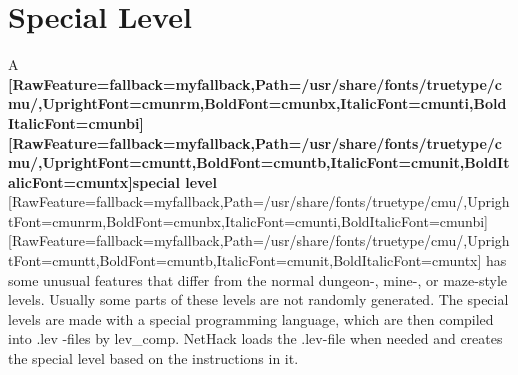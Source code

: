 \part{Special Level}
\label{0}A {\bfseries \allowbreak{}\setmainfont{cmunbx.ttf}[RawFeature={fallback=myfallback},Path=/usr/share/fonts/truetype/cmu/,UprightFont=cmunrm,BoldFont=cmunbx,ItalicFont=cmunti,BoldItalicFont=cmunbi]\setmonofont{cmunbx.ttf}[RawFeature={fallback=myfallback},Path=/usr/share/fonts/truetype/cmu/,UprightFont=cmuntt,BoldFont=cmuntb,ItalicFont=cmunit,BoldItalicFont=cmuntx]\bfseries special level}{$\text{ }$}\allowbreak{}\setmainfont{cmunrm.ttf}[RawFeature={fallback=myfallback},Path=/usr/share/fonts/truetype/cmu/,UprightFont=cmunrm,BoldFont=cmunbx,ItalicFont=cmunti,BoldItalicFont=cmunbi]\setmonofont{cmunrm.ttf}[RawFeature={fallback=myfallback},Path=/usr/share/fonts/truetype/cmu/,UprightFont=cmuntt,BoldFont=cmuntb,ItalicFont=cmunit,BoldItalicFont=cmuntx] has some unusual features that differ from the normal dungeon-{}, mine-{}, or maze-{}style levels. Usually some parts of these levels are not randomly generated. The special levels are made with a special programming language\footnotemark[1], which are then compiled into .lev -{}files by lev\_comp\footnotemark[2]. NetHack loads the .lev-{}file when needed and creates the special level based on the instructions in it.




